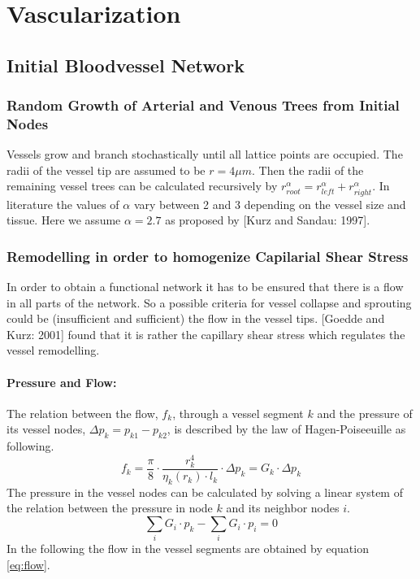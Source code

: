 \documentclass{article}
\title{}
\author{Nick Jagiella}
\date{Mai 2010}
\begin{document}
   \maketitle

\section{Vascularization}
\subsection{Initial Bloodvessel Network}
\subsubsection{Random Growth of Arterial and Venous Trees from Initial Nodes}
Vessels grow and branch stochastically until all lattice points are occupied. The radii of the vessel tip are assumed to be $r = 4\mu m$. Then the radii of the remaining vessel trees can be calculated recursively by $r_{root}^\alpha = r_{left}^\alpha + r_{right}^\alpha$. In literature the values of $\alpha$ vary between 2 and 3 depending on the vessel size and tissue. Here we assume $\alpha = 2.7$ as proposed by [Kurz and Sandau: 1997].
\subsubsection{Remodelling in order to homogenize Capilarial Shear Stress}
In order to obtain a functional network it has to be ensured that there is a flow in all parts of the network. So a possible criteria for vessel collapse and sprouting could be (insufficient and sufficient) the flow in the vessel tips. [Goedde and Kurz: 2001] found that it is rather the capillary shear stress which regulates the vessel remodelling.

\paragraph{Pressure and Flow:}
The relation between the flow, $f_k$, through a vessel segment $k$ and the pressure of its vessel nodes, $\Delta p_k = p
_{k1} - p_{k2}$, is described by the law of Hagen-Poiseeuille as following.
\begin{equation}
	f_k = \frac{\pi}{8} \cdot \frac{r^4_k}{\eta_k(r_k)\cdot l_k}\cdot \Delta p_k = G_k \cdot \Delta p_k\label{eq:flow}
\end{equation}
The pressure in the vessel nodes can be calculated by solving a linear system of the relation between the pressure in node $k$ and its neighbor nodes $i$.
\begin{equation}
	\sum_i G_i\cdot p_k - \sum_i G_i\cdot p_i = 0\label{eq:pressure}
\end{equation}
In the following the flow in the vessel segments are obtained by equation \ref{eq:flow}.
\end{document}
